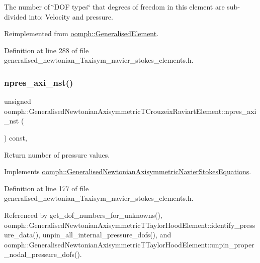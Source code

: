 The number of \char`\"{}\+D\+O\+F types\char`\"{} that degrees of freedom in this element are sub-\/divided into\+: Velocity and pressure. 



Reimplemented from \hyperlink{classoomph_1_1GeneralisedElement_a0c6037a870597b35dcf1c780710b9a56}{oomph\+::\+Generalised\+Element}.



Definition at line 288 of file generalised\+\_\+newtonian\+\_\+\+Taxisym\+\_\+navier\+\_\+stokes\+\_\+elements.\+h.

\mbox{\label{classoomph_1_1GeneralisedNewtonianAxisymmetricTCrouzeixRaviartElement_ad42bb6148e35bd44bde015d501fc2a43}} 
\subsubsection{\texorpdfstring{npres\+\_\+axi\+\_\+nst()}{npres\_axi\_nst()}}
{\footnotesize\ttfamily unsigned oomph\+::\+Generalised\+Newtonian\+Axisymmetric\+T\+Crouzeix\+Raviart\+Element\+::npres\+\_\+axi\+\_\+nst (\begin{DoxyParamCaption}{ }\end{DoxyParamCaption}) const\hspace{0.3cm}{\ttfamily [inline]}, {\ttfamily [virtual]}}



Return number of pressure values. 



Implements \hyperlink{classoomph_1_1GeneralisedNewtonianAxisymmetricNavierStokesEquations_a4c4c6c5ae937187b735e79451a0befbc}{oomph\+::\+Generalised\+Newtonian\+Axisymmetric\+Navier\+Stokes\+Equations}.



Definition at line 177 of file generalised\+\_\+newtonian\+\_\+\+Taxisym\+\_\+navier\+\_\+stokes\+\_\+elements.\+h.



Referenced by get\+\_\+dof\+\_\+numbers\+\_\+for\+\_\+unknowns(), oomph\+::\+Generalised\+Newtonian\+Axisymmetric\+T\+Taylor\+Hood\+Element\+::identify\+\_\+pressure\+\_\+data(), unpin\+\_\+all\+\_\+internal\+\_\+pressure\+\_\+dofs(), and oomph\+::\+Generalised\+Newtonian\+Axisymmetric\+T\+Taylor\+Hood\+Element\+::unpin\+\_\+proper\+\_\+nodal\+\_\+pressure\+\_\+dofs().

